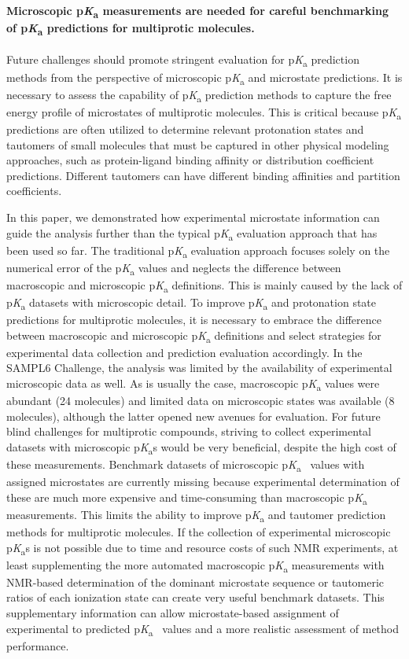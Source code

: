 \documentclass[9pt,lineno,final]{elife}
\newcommand{\pKa}{p\textit{K}\textsubscript{a}}
\begin{document}
\paragraph{Microscopic \pKa{} measurements are needed for careful benchmarking of \pKa{} predictions for multiprotic molecules.}
Future challenges should promote stringent evaluation for \pKa{} prediction methods from the perspective of microscopic \pKa{} and microstate predictions.
It is necessary to assess the capability of \pKa{} prediction methods to capture the free energy profile of microstates of multiprotic molecules. 
This is critical because \pKa{} predictions are often utilized to determine relevant protonation states and tautomers of small molecules that must be captured in other physical modeling approaches, such as protein-ligand binding affinity or distribution coefficient predictions. 
Different tautomers can have different binding affinities and partition coefficients.

In this paper, we demonstrated how experimental microstate information can guide the analysis further than the typical \pKa{} evaluation approach that has been used so far. 
The traditional \pKa{} evaluation approach focuses solely on the numerical error of the \pKa{} values and neglects the difference between macroscopic and microscopic \pKa{} definitions.
This is mainly caused by the lack of \pKa{} datasets with microscopic detail. 
To improve \pKa{} and protonation state predictions for multiprotic molecules, it is necessary to embrace the difference between macroscopic and microscopic \pKa{} definitions and select strategies for experimental data collection and prediction evaluation accordingly.
In the SAMPL6 Challenge, the analysis was limited by the availability of experimental microscopic data as well. 
As is usually the case, macroscopic \pKa{} values were abundant (24 molecules) and limited data on microscopic states was available (8 molecules), although the latter opened new avenues for evaluation. 
For future blind challenges for multiprotic compounds, striving to collect experimental datasets with microscopic \pKa{}s would be very beneficial, despite the high cost of these measurements. 
Benchmark datasets of microscopic \pKa{}~ values with assigned microstates are currently missing because experimental determination of these are much more expensive and time-consuming than macroscopic \pKa{} measurements. 
This limits the ability to improve \pKa{} and tautomer prediction methods for multiprotic molecules. 
If the collection of experimental microscopic \pKa{}s is not possible due to time and resource costs of such NMR experiments, at least supplementing the more automated macroscopic \pKa{} measurements with NMR-based determination of the dominant microstate sequence or tautomeric ratios of each ionization state can create very useful benchmark datasets. 
This supplementary information can allow microstate-based assignment of experimental to predicted \pKa{}~ values and a more realistic assessment of method performance.
\end{document}
